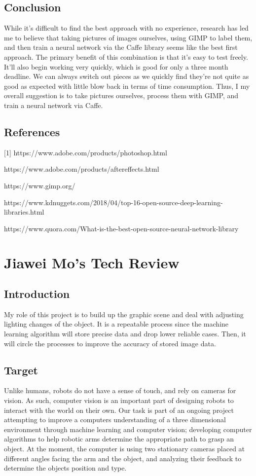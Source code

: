\documentclass[10pt,journal,compsoc, draftclsnofoot,onecolumn]{IEEEtran}
\begin{document}
\subsection{Conclusion}
While it's difficult to find the best approach with no experience, research has led me to believe that taking pictures of images ourselves, using GIMP to label them, and then train a neural network via the Caffe library seems like the best first approach.
The primary benefit of this combination is that it's easy to test freely.
It'll also begin working very quickly, which is good for only a three month deadline.
We can always switch out pieces as we quickly find they're not quite as good as expected with little blow back in terms of time consumption.
Thus, I my overall suggestion is to take pictures ourselves, process them with GIMP, and train a neural network via Caffe.

\subsection{References}
[1]	https://www.adobe.com/products/photoshop.html

\noindent
[2]	https://www.adobe.com/products/aftereffects.html

\noindent
[3]	https://www.gimp.org/

\noindent
[4]	https://www.kdnuggets.com/2018/04/top-16-open-source-deep-learning-libraries.html

\noindent
[5]	https://www.quora.com/What-is-the-best-open-source-neural-network-library

\newpage
\section{Jiawei Mo's Tech Review}

\subsection{Introduction}
My role of this project is to build up the graphic scene and deal with adjusting lighting changes of the object. It is a repeatable process since the machine learning algorithm will store precise data and drop lower reliable cases. Then, it will circle the processes to improve the accuracy of stored image data. 

\subsection{Target}
Unlike humans, robots do not have a sense of touch, and rely on cameras for vision. As such, computer vision is an important part of designing robots to interact with the world on their own. Our task is part of an ongoing project attempting to improve a computers understanding of a three dimensional environment through machine learning and computer vision; developing computer algorithms to help robotic arms determine the appropriate path to grasp an object. At the moment, the computer is using two stationary cameras placed at different angles facing the arm and the object, and analyzing their feedback to determine the objects position and type. \\
\end{document}
